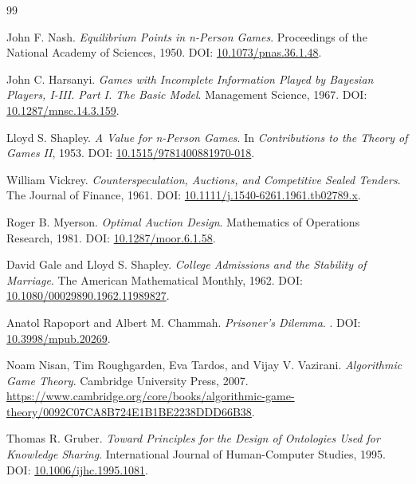 \documentclass[11pt]{article}
\begin{document}
\begin{thebibliography}{99}

John F. Nash.
\newblock \emph{Equilibrium Points in n-Person Games}.
\newblock Proceedings of the National Academy of Sciences, 1950. DOI: \href{https://doi.org/10.1073/pnas.36.1.48}{10.1073/pnas.36.1.48}.

John C. Harsanyi.
\newblock \emph{Games with Incomplete Information Played by Bayesian Players, I-III. Part I. The Basic Model}.
\newblock Management Science, 1967. DOI: \href{https://doi.org/10.1287/mnsc.14.3.159}{10.1287/mnsc.14.3.159}.

Lloyd S. Shapley.
\newblock \emph{A Value for n-Person Games}.
\newblock In \emph{Contributions to the Theory of Games II}, 1953. DOI: \href{https://doi.org/10.1515/9781400881970-018}{10.1515/9781400881970-018}.

William Vickrey.
\newblock \emph{Counterspeculation, Auctions, and Competitive Sealed Tenders}.
\newblock The Journal of Finance, 1961. DOI: \href{https://doi.org/10.1111/j.1540-6261.1961.tb02789.x}{10.1111/j.1540-6261.1961.tb02789.x}.

Roger B. Myerson.
\newblock \emph{Optimal Auction Design}.
\newblock Mathematics of Operations Research, 1981. DOI: \href{https://doi.org/10.1287/moor.6.1.58}{10.1287/moor.6.1.58}.

David Gale and Lloyd S. Shapley.
\newblock \emph{College Admissions and the Stability of Marriage}.
\newblock The American Mathematical Monthly, 1962. DOI: \href{https://doi.org/10.1080/00029890.1962.11989827}{10.1080/00029890.1962.11989827}.

Anatol Rapoport and Albert M. Chammah.
\newblock \emph{Prisoner's Dilemma}.
. DOI: \href{https://doi.org/10.3998/mpub.20269}{10.3998/mpub.20269}.

Noam Nisan, Tim Roughgarden, Eva Tardos, and Vijay V. Vazirani.
\newblock \emph{Algorithmic Game Theory}.
\newblock Cambridge University Press, 2007. \url{https://www.cambridge.org/core/books/algorithmic-game-theory/0092C07CA8B724E1B1BE2238DDD66B38}.

Thomas R. Gruber.
\newblock \emph{Toward Principles for the Design of Ontologies Used for Knowledge Sharing}.
\newblock International Journal of Human-Computer Studies, 1995. DOI: \href{https://doi.org/10.1006/ijhc.1995.1081}{10.1006/ijhc.1995.1081}.


\end{thebibliography}
\end{document}
